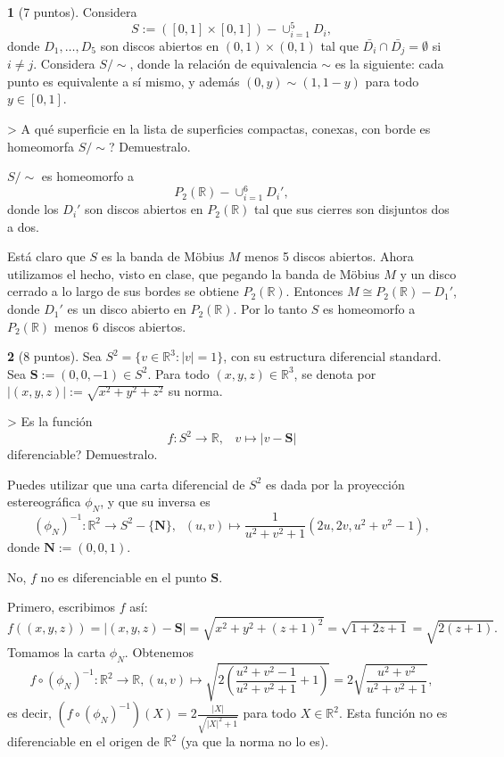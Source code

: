 \documentclass[12pt,a4paper]{report}
\theoremstyle{definition}
\newtheorem{ex}{}
\newcommand{\RR}{\ensuremath{\mathbb R}}
\begin{document}
\begin{ex} [7 puntos]
Considera $$S:=([0,1]\times[0,1])-\cup_{i=1}^5 D_i,$$ donde  $D_1,\dots,D_5$ son  discos abiertos en  $(0,1)\times(0,1)$ tal que  $\bar{D_i}\cap \bar{D_j}=\emptyset$ si $i\neq j$. Considera 
$S/\sim$, donde la relaci\'on de equivalencia $\sim$ es la siguiente:  cada punto es equivalente a s\'i mismo, y adem\'as $(0,y)\sim (1,1-y)$ para todo $y\in [0,1]$. 

> A qu\'e superficie en la lista de superficies compactas, conexas, con borde es homeomorfa  $S/\sim$? Demuestralo.
\end{ex}
 \begin{it}
$S/\sim$ es homeomorfo a $$P_2(\RR)- \cup_{i=1}^6 D_i',$$ donde
los $D_i'$ son  discos abiertos en $P_2(\RR)$ tal que sus cierres son disjuntos dos a dos.

Est\'a claro que $S$ es la banda de M\"obius  $M$ menos 5 discos abiertos. Ahora utilizamos el hecho, visto en clase, que pegando la banda de M\"obius $M$ y un disco cerrado a lo largo de sus bordes se obtiene $P_2(\RR)$. Entonces $M\cong P_2(\RR)- D_1'$, donde  $D_1'$ es un disco abierto en $P_2(\RR)$. Por lo tanto $S$ es homeomorfo a $P_2(\RR)$ menos 6 discos abiertos.
\end{it} 

\begin{ex}  [8 puntos]
Sea $S^2=\{v\in \RR^3: |v|=1\}$, con su estructura   diferencial standard. Sea $\textbf{S}:=(0,0,-1)\in S^2$.
Para todo $(x,y,z)\in \RR^3$, se denota por $|(x,y,z)|:=\sqrt{x^2+y^2+z^2}$ su norma.

> Es la funci\'on
$$f \colon S^2\to \RR,  \;\;\; v\mapsto |v-\textbf{S}|$$
diferenciable? Demuestralo.

 Puedes utilizar que una carta diferencial de $S^2$ es dada por la proyecci\'on estereogr\'afica $\phi_N$, y que su inversa es $$(\phi_N)^{-1} \colon \RR^2 \to S^2-\{\textbf{N}\},\;\;(u,v)\mapsto \frac{1}{u^2+v^2+1}(2u,2v,u^2+v^2-1),$$
donde $\textbf{N}:=(0,0,1)$.
\end{ex}
 \begin{it}
No, $f$ no es diferenciable en el punto $\textbf{S}$.

Primero, escribimos $f$ as\'i: 
$$f((x,y,z))=|(x,y,z)-\textbf{S}|=\sqrt{x^2+y^2+(z+1)^2}=
\sqrt{1+2z+1}=\sqrt{2(z+1)}.$$
Tomamos la carta $\phi_N$. Obtenemos
$$f \circ (\phi_N)^{-1} \colon \RR^2 \to \RR, (u,v)\mapsto \sqrt{2(\frac{u^2+v^2-1}{u^2+v^2+1}+1)}=2\sqrt{\frac{u^2+v^2}{u^2+v^2+1}}
,$$ es decir, $(f \circ (\phi_N)^{-1})(X)=2\frac{|X|}{\sqrt{|X|^2+1}}$ para todo $X\in \RR^2$.
Esta funci\'on no es diferenciable en el origen de $\RR^2$ (ya que la norma no lo es).
\end{it}
\end{document}
